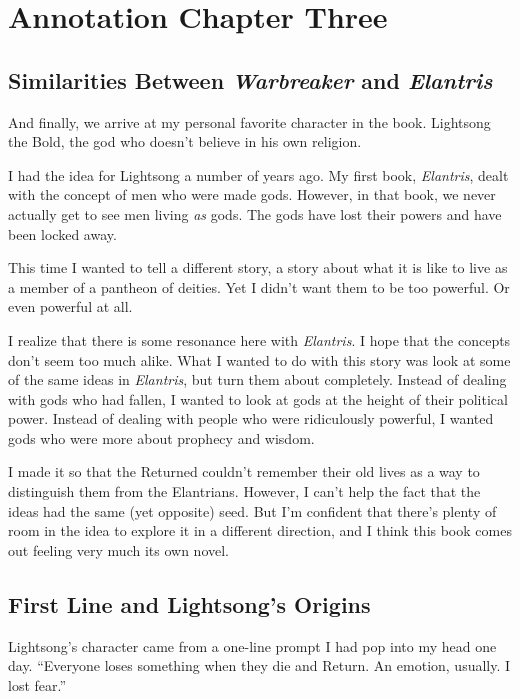 \section{Annotation Chapter Three}

\subsection*{Similarities Between \textit{Warbreaker} and \textit{Elantris}}

And finally, we arrive at my personal favorite character in the book. Lightsong the Bold, the god who doesn’t believe in his own religion.

I had the idea for Lightsong a number of years ago. My first book, \textit{Elantris}, dealt with the concept of men who were made gods. However, in that book, we never actually get to see men living \textit{as} gods. The gods have lost their powers and have been locked away.

This time I wanted to tell a different story, a story about what it is like to live as a member of a pantheon of deities. Yet I didn’t want them to be too powerful. Or even powerful at all.

I realize that there is some resonance here with \textit{Elantris}. I hope that the concepts don’t seem too much alike. What I wanted to do with this story was look at some of the same ideas in \textit{Elantris}, but turn them about completely. Instead of dealing with gods who had fallen, I wanted to look at gods at the height of their political power. Instead of dealing with people who were ridiculously powerful, I wanted gods who were more about prophecy and wisdom.

I made it so that the Returned couldn’t remember their old lives as a way to distinguish them from the Elantrians. However, I can’t help the fact that the ideas had the same (yet opposite) seed. But I’m confident that there’s plenty of room in the idea to explore it in a different direction, and I think this book comes out feeling very much its own novel.

\subsection*{First Line and Lightsong’s Origins}

Lightsong’s character came from a one-line prompt I had pop into my head one day. “Everyone loses something when they die and Return. An emotion, usually. I lost fear.”

